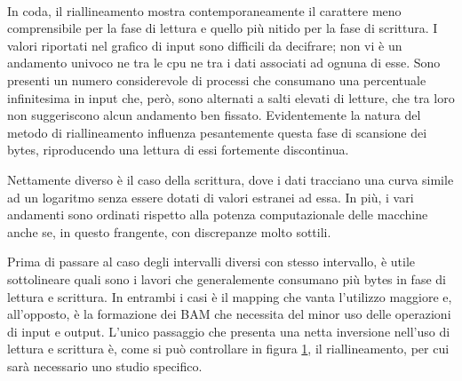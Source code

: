 \begin{figure}[H]
\centering
{} \quad
{} \\
\caption{}
\label{fig:IOR}
\end{figure}

In coda, il riallineamento mostra contemporaneamente il carattere meno comprensibile per la fase di lettura e quello più nitido per la fase di scrittura.
I valori riportati nel grafico di input sono difficili da decifrare; non vi è un andamento univoco ne tra le cpu ne tra i dati associati ad ognuna di esse.
Sono presenti un numero considerevole di processi che consumano una percentuale infinitesima in input che, però, sono alternati a salti elevati di letture, che tra loro non suggeriscono alcun andamento ben fissato.
Evidentemente la natura del metodo di riallineamento influenza pesantemente questa fase di scansione dei bytes, riproducendo una lettura di essi fortemente discontinua.

Nettamente diverso è il caso della scrittura, dove i dati tracciano una curva simile ad un logaritmo senza essere dotati di valori estranei ad essa.
In più, i vari andamenti sono ordinati rispetto alla potenza computazionale delle macchine anche se, in questo frangente, con discrepanze molto sottili.

\par Prima di passare al caso degli intervalli diversi con stesso intervallo, è utile sottolineare quali sono i lavori che generalemente consumano più bytes in fase di lettura e scrittura.
In entrambi i casi è il mapping che vanta l'utilizzo maggiore e, all'opposto, è la formazione dei BAM che necessita del minor uso delle operazioni di input e output. 
L'unico passaggio che presenta una netta inversione nell'uso di lettura e scrittura è, come si può controllare in figura \ref{fig:IOR}, il riallineamento, per cui sarà necessario uno studio specifico.

